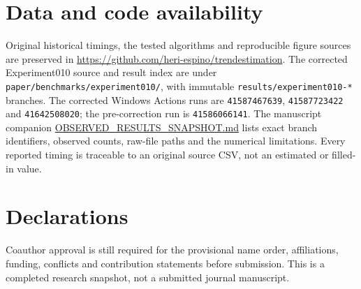 \section*{Data and code availability}
Original historical timings, the tested algorithms
and reproducible figure sources are preserved in
\url{https://github.com/heri-espino/trendestimation}.
The corrected Experiment010 source and result index
are under \texttt{paper/benchmarks/experiment010/},
with immutable \texttt{results/experiment010-*} branches.
The corrected Windows Actions runs are
\texttt{41587467639}, \texttt{41587723422} and
\texttt{41642508020}; the pre-correction run is
\texttt{41586066141}. The manuscript companion
\url{OBSERVED_RESULTS_SNAPSHOT.md}
lists exact branch identifiers, observed counts,
raw-file paths and the numerical limitations.
Every reported timing is traceable to an original
source CSV, not an estimated or filled-in value.

\section*{Declarations}
Coauthor approval is still required for the
provisional name order, affiliations, funding,
conflicts and contribution statements before
submission. This is a completed research
snapshot, not a submitted journal manuscript.
